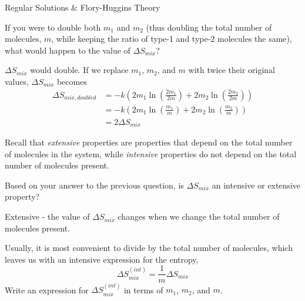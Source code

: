 \begin{activity}{Regular Solutions \& Flory-Huggins Theory}
\begin{ctqs}

	\question If you were to double both $m_1$ and $m_2$ (thus doubling the total number of molecules, $m$, while keeping the ratio of type-1 and type-2 molecules the same), what would happen to the value of $\Delta S_{mix}$?
	
		\begin{solution}[1in]
		
			$\Delta S_{mix}$ would double.  If we replace $m_1$, $m_2$, and $m$ with twice their original values, $\Delta S_{mix}$ becomes
			\vspace{-6pt}
			\begin{align*}
				\Delta S_{mix,doubled} &= -k\left(2m_1 \ln\left(\frac{2m_1}{2m}\right) + 2m_2 \ln\left(\frac{2m_2}{2m}\right) \right)\\
				 &= -k\left(2m_1 \ln\left(\frac{m_1}{m}\right) + 2m_2 \ln\left(\frac{m_2}{m}\right) \right)\\
				 &= 2\Delta S_{mix}
			\end{align*}
		\end{solution}
	
	
	\question Recall that \emph{extensive} properties are properties that depend on the total number of molecules in the system, while \emph{intensive} properties do not depend on the total number of molecules present.
	
	Based on your answer to the previous question, is $\Delta S_{mix}$ an intensive or extensive property?
	
		\begin{solution}[0.75in]
		
			Extensive - the value of $\Delta S_{mix}$ changes when we change the total number of molecules present.
		
		\end{solution}
	
	\question Usually, it is most convenient to divide by the total number of molecules, which leaves us with an intensive expression for the entropy,
		\begin{equation*}
			\Delta S_{mix}^{(int)} = \frac{1}{m} \Delta S_{mix}
		\end{equation*}
		Write an expression for $\Delta S_{mix}^{(int)}$ in terms of $m_1$, $m_2$, and $m$.
		
			\begin{solution}[1in]
			

\end{solution}
\end{ctqs}
\end{activity}
